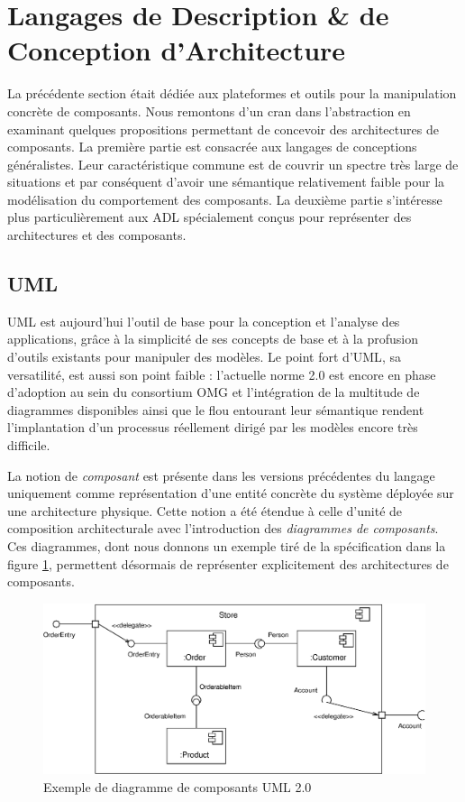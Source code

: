 \section{Langages de Description \& de Conception d'Architecture}
\label{sec:lang-de-descr}

La pr\'ec\'edente section \'etait d\'edi\'ee aux plateformes et
outils pour la manipulation concr\`ete de composants. Nous remontons
d'un cran dans l'abstraction en examinant quelques propositions
permettant de concevoir des architectures de composants. La
premi\`ere partie est consacr\'ee aux langages de conceptions
g\'en\'eralistes. Leur caract\'eristique commune est de couvrir un
spectre tr\`es large de situations et par cons\'equent d'avoir une
s\'emantique relativement faible pour la mod\'elisation du
comportement des composants. La deuxi\`eme partie s'int\'eresse plus
particuli\`erement aux \textsf{ADL} sp\'ecialement con\c{c}us pour
repr\'esenter des architectures et des composants.

\subsection{UML}
\label{sec:uml}
\textsf{UML} est aujourd'hui l'outil de base pour la conception et
l'analyse des applications, gr\^ace \`a la simplicit\'e de ses
concepts de base et \`a la profusion d'outils existants pour
manipuler des mod\`eles. Le point fort d'\textsf{UML}, sa versatilit\'e, est  aussi son point faible : l'actuelle norme 2.0 est encore
en phase d'adoption au sein du consortium \textsf{OMG} et
l'int\'egration de la multitude de diagrammes disponibles ainsi que
le flou entourant leur s\'emantique rendent l'implantation
d'un processus r\'eellement dirig\'e par les mod\`eles encore
tr\`es difficile.

La notion de \emph{composant} est pr\'esente dans les versions
pr\'ec\'edentes du langage uniquement comme repr\'esentation d'une
entit\'e concr\`ete du syst\`eme d\'eploy\'ee sur une
architecture physique. Cette notion a \'et\'e \'etendue \`a celle
d'unit\'e de composition architecturale avec l'introduction des
\emph{diagrammes de composants}. Ces diagrammes, dont nous donnons un exemple tir\'e de la
sp\'ecification\cite{uml20-comp} dans la figure
\ref{fig-uml20-comp-sample}, permettent d\'esormais de repr\'esenter
explicitement des architectures de composants.

\begin{figure}[htbp]
    \centering
    \includegraphics[width=.9\textwidth]{figures/fig-uml20-comp-sample.eps}
    \caption{Exemple de diagramme de composants UML 2.0}
    \label{fig-uml20-comp-sample}
\end{figure}

